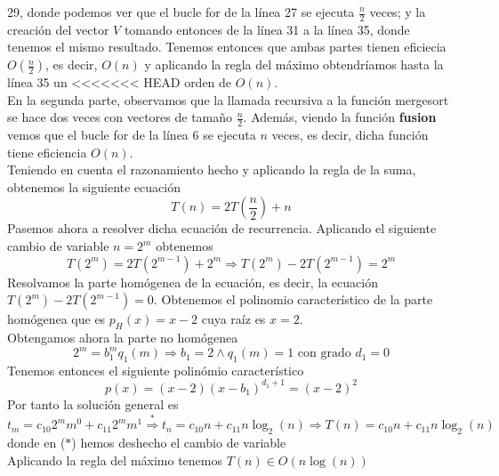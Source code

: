 \documentclass[11pt]{article}
\begin{document}
        29, donde podemos ver que el bucle for de la línea 27 se ejecuta $\frac{n}{2}$ veces; y la creación del vector 
        $V$ tomando entonces de la línea 31 a la línea 35, donde tenemos el mismo resultado. Tenemos entonces que ambas partes 
        tienen eficiecia $O(\frac{n}{2})$, es decir, $O(n)$ y aplicando la regla del máximo obtendríamos hasta la línea 35 un
<<<<<<< HEAD
        orden de $O(n)$. \\
        En la segunda parte, observamos que la llamada recursiva a la función mergesort se hace dos veces con vectores de tamaño $\frac{n}{2}$.
        Además, viendo la función \textbf{fusion} vemos que el bucle for de la línea 6 se ejecuta $n$ veces, es decir, dicha función
        tiene eficiencia $O(n)$. \\
        Teniendo en cuenta el razonamiento hecho y aplicando la regla de la suma, obtenemos la siguiente ecuación
        \begin{equation*}
            T(n)=2T(\frac{n}{2})+n
        \end{equation*}
        Pasemos ahora a resolver dicha ecuación de recurrencia. Aplicando el siguiente cambio de variable $n=2^m$ obtenemos
        \begin{equation*}
            T(2^m)=2T(2^{m-1})+2^m \Longrightarrow T(2^m)-2T(2^{m-1})=2^m
        \end{equation*}
        Resolvamos la parte homógenea de la ecuación, es decir, la ecuación $T(2^m)-2T(2^{m-1})=0$. Obtenemos el polinomio
        característico de la parte homógenea que es $p_H(x)=x-2$ cuya raíz es $x=2$. \\
        Obtengamos ahora la parte no homógenea
        \begin{equation*}
            2^m=b_1^m q_1(m) \Longrightarrow b_1=2 \wedge q_1(m)=1 \text{ con grado } d_1=0
        \end{equation*}
        Tenemos entonces el siguiente polinómio característico
        \begin{equation*}
            p(x)=(x-2)(x-b_1)^{d_1+1}=(x-2)^2
        \end{equation*}
        Por tanto la solución general es
        \begin{equation*}
            t_m=c_{10}2^mm^0+c_{11}2^mm^1  \overset{*}{\Longrightarrow}  t_n=c_{10}n+c_{11}n\log_2(n) \Longrightarrow T(n)=c_{10}n+c_{11}n\log_2(n)
        \end{equation*}
        donde en ($*$) hemos deshecho el cambio de variable \\
        Aplicando la regla del máximo tenemos $T(n) \in O(n\log(n))$
\end{document}
